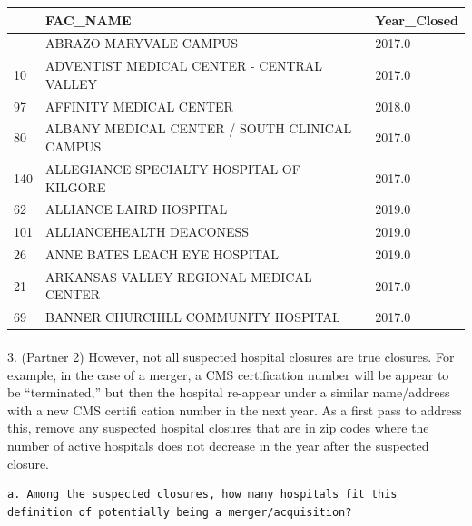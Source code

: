 \documentclass[
  letterpaper,
  DIV=11,
  numbers=noendperiod]{scrartcl}
\makeatletter
\let\oldparagraph\paragraph
\renewcommand{\paragraph}{
    \@ifstar
      \xxxParagraphStar
      \xxxParagraphNoStar
  }
\newcommand{\xxxParagraphStar}[1]{\oldparagraph*{#1}\mbox{}}
\newcommand{\xxxParagraphNoStar}[1]{\oldparagraph{#1}\mbox{}}
\makeatother
\begin{document}
\begin{longtable}[]{@{}lll@{}}
\toprule\noalign{}
& FAC\_NAME & Year\_Closed \\
\midrule\noalign{}
\endhead
\bottomrule\noalign{}
\endlastfoot
4 & ABRAZO MARYVALE CAMPUS & 2017.0 \\
10 & ADVENTIST MEDICAL CENTER - CENTRAL VALLEY & 2017.0 \\
97 & AFFINITY MEDICAL CENTER & 2018.0 \\
80 & ALBANY MEDICAL CENTER / SOUTH CLINICAL CAMPUS & 2017.0 \\
140 & ALLEGIANCE SPECIALTY HOSPITAL OF KILGORE & 2017.0 \\
62 & ALLIANCE LAIRD HOSPITAL & 2019.0 \\
101 & ALLIANCEHEALTH DEACONESS & 2019.0 \\
26 & ANNE BATES LEACH EYE HOSPITAL & 2019.0 \\
21 & ARKANSAS VALLEY REGIONAL MEDICAL CENTER & 2017.0 \\
69 & BANNER CHURCHILL COMMUNITY HOSPITAL & 2017.0 \\
\end{longtable}

\paragraph{3. (Partner 2) However, not all suspected hospital closures
are true closures. For example, in the case of a merger, a CMS
certification number will be appear to be ``terminated,'' but then the
hospital re-appear under a similar name/address with a new CMS certifi
cation number in the next year. As a first pass to address this, remove
any suspected hospital closures that are in zip codes where the number
of active hospitals does not decrease in the year after the suspected
closure.}\label{partner-2-however-not-all-suspected-hospital-closures-are-true-closures.-for-example-in-the-case-of-a-merger-a-cms-certification-number-will-be-appear-to-be-terminated-but-then-the-hospital-re-appear-under-a-similar-nameaddress-with-a-new-cms-certifi-cation-number-in-the-next-year.-as-a-first-pass-to-address-this-remove-any-suspected-hospital-closures-that-are-in-zip-codes-where-the-number-of-active-hospitals-does-not-decrease-in-the-year-after-the-suspected-closure.}

\begin{verbatim}
a. Among the suspected closures, how many hospitals fit this definition of potentially being a merger/acquisition?
\end{verbatim}
\end{document}
